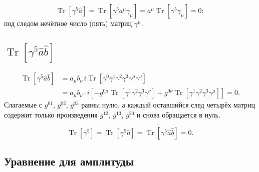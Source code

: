\documentclass[../final.tex]{subfiles}
\begin{document}
\begin{equation*}
    \operatorname{Tr}[\gamma^5\hat a]
    =\operatorname{Tr}\left[\gamma^5a^\mu\gamma_\mu\right]
    =a^\mu\operatorname{Tr}\left[\gamma^5\gamma_\mu\right]=0:
\end{equation*}
под следом нечётное число (пять) матриц $\gamma^\mu$.

\subsection*{\texorpdfstring{$\operatorname{Tr}[\gamma^5\hat a\hat b]$}{Tr γ5 a b}}

\begin{align*}
    \operatorname{Tr}[\gamma^5\hat a\hat b]
    &=a_\mu b_\nu\,i\operatorname{Tr}\left[\gamma^0\gamma^1\gamma^2\gamma^3
    \gamma^\mu\gamma^\nu\right]\\
    &=a_\mu b_\nu\cdot i\left[
    -g^{0\mu}\operatorname{Tr}\left[\gamma^1\gamma^2\gamma^3\gamma^\nu\right]
    +g^{0\nu}\operatorname{Tr}\left[\gamma^1\gamma^2\gamma^3\gamma^\mu\right]
    \right]=0.
\end{align*}
Слагаемые с $g^{01}$, $g^{02}$, $g^{03}$ равны нулю, а каждый оставшийся след
четырёх матриц содержит только произведения $g^{12}$, $g^{13}$, $g^{23}$
и снова обращается в нуль.

\answer
\begin{equation*}
    \operatorname{Tr}[\gamma^5]=\operatorname{Tr}[\gamma^5\hat a]
    =\operatorname{Tr}[\gamma^5\hat a\hat b]=0.
\end{equation*}


\subsection*{Уравнение для амплитуды}
\end{document}
